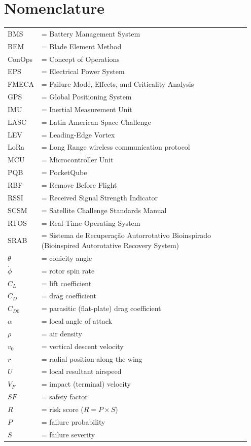 \section*{Nomenclature}
\bgroup{}
\begin{tabular}{@{}p{0.1\linewidth}p{0.85\linewidth}@{}}
BMS & = Battery Management System \\
BEM & = Blade Element Method \\
ConOps & = Concept of Operations \\
EPS & = Electrical Power System \\
FMECA & = Failure Mode, Effects, and Criticality Analysis \\
GPS & = Global Positioning System \\
IMU & = Inertial Measurement Unit \\
LASC & = Latin American Space Challenge \\
LEV & = Leading-Edge Vortex \\
LoRa & = Long Range wireless communication protocol \\
MCU & = Microcontroller Unit \\
PQB & = PocketQube \\
RBF & = Remove Before Flight \\
RSSI & = Received Signal Strength Indicator \\
SCSM & = Satellite Challenge Standards Manual \\
RTOS & = Real-Time Operating System \\
SRAB & = Sistema de Recuperação Autorrotativo Bioinspirado (Bioinspired Autorotative Recovery System) \\
$\theta$ & = conicity angle \\
$\dot{\phi}$ & = rotor spin rate \\
$C_L$ & = lift coefficient \\
$C_D$ & = drag coefficient \\
$C_{D0}$ & = parasitic (flat-plate) drag coefficient \\
$\alpha$ & = local angle of attack \\
$\rho$ & = air density \\
$v_0$ & = vertical descent velocity \\
$r$ & = radial position along the wing \\
$U$ & = local resultant airspeed \\
$V_F$ & = impact (terminal) velocity \\
$SF$ & = safety factor \\
$R$ & = risk score ($R = P \times S$) \\
$P$ & = failure probability \\
$S$ & = failure severity \\
\end{tabular}
\egroup